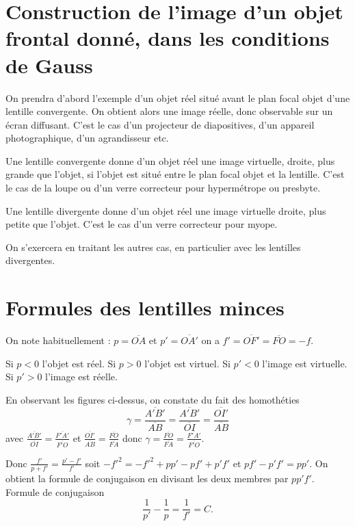 \section{Construction de l'image d'un objet frontal donné, dans les conditions 
de Gauss}%
\label{chap8-sec:constructionimagefrontal}%

On prendra d'abord l'exemple d'un objet réel situé avant le plan focal objet 
d'une lentille convergente. On obtient alors une image réelle, donc observable 
sur un écran diffusant. C'est le cas d'un projecteur de diapositives, d'un 
appareil photographique, d'un agrandisseur etc.
%

Une lentille convergente donne d'un objet réel une image virtuelle, droite, 
plus grande que l'objet, si l'objet est situé entre le plan focal objet et la 
lentille. C'est le cas de la loupe ou d'un verre correcteur pour hypermétrope 
ou presbyte.

Une lentille divergente donne d'un objet  réel une image virtuelle droite, plus 
petite que l'objet. C'est le cas d'un verre correcteur pour myope.

On s'exercera en traitant les autres cas, en particulier avec les lentilles 
divergentes.

\section{Formules des lentilles minces}%
\label{chap8-sec:formulesdeslentillesminces}%
On note habituellement : \(p=\overline{OA}\) et \(p'=\overline{OA'}\) on a 
\(f'=\overline{OF'}=\overline{FO}=-f\).

Si \(p < 0\) l'objet est réel. Si \(p > 0\) l'objet est virtuel. Si \(p' < 0\) 
l'image est virtuelle. Si \(p' > 0\) l'image est réelle.

En observant les figures ci-dessus, on constate du fait des homothéties
\begin{equation}%
  \gamma = \frac{\overline{A'B'}}{\overline{AB}} = 
  \frac{\overline{A'B'}}{\overline{OI}} = \frac{\overline{OI'}}{\overline{AB}}
\end{equation}%
 avec \(  \frac{\overline{A'B'}}{\overline{OI}} =  
 \frac{\overline{F'A'}}{\overline{F'O}}\) et \( 
 \frac{\overline{OI'}}{\overline{AB}} = \frac{\overline{FO}}{\overline{FA}} \) 
 donc \(\gamma = \frac{\overline{FO}}{\overline{FA}} = 
 \frac{\overline{F'A'}}{\overline{F'O}}\).

Donc \(\frac{f'}{p+f'} = \frac{p'-f'}{f'}\) soit \(-f'^2 = -f'^2 + pp' - pf' + 
p'f'\)  et \(pf' - p'f' = pp'\). On obtient la formule de conjugaison en 
divisant les deux membres par \(pp'f'\).
Formule de conjugaison
\begin{equation}%
  \frac{1}{p'} - \frac{1}{p} = \frac{1}{f'} = C.
\end{equation}%

